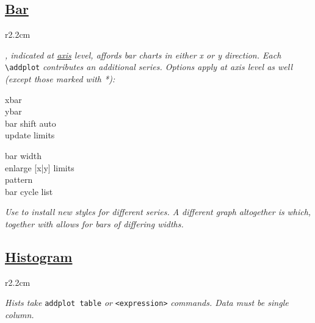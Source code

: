 \subsection*{\href{\docurl\#pgfp./pgfplots/xbar}{Bar}}

\begin{wrapfigure}[5]{r}{2.2cm}
\vspace{-8mm}
\resizebox{2cm}{!}{}
\end{wrapfigure}
\textit{, indicated at \underline{axis} level, affords bar charts in either x or y direction. Each }\texttt{\textbackslash addplot}\textit{ contributes an additional series. Options apply at axis level as well (except those marked with *):}

{\color{blue}
\begin{minipage}[t]{3.0cm}
xbar\\
ybar\\
bar shift auto\\
update limits
\end{minipage}
\begin{minipage}[t]{3.0cm}
bar width\\
enlarge [x|y] limits\\
pattern\\
bar cycle list
\end{minipage}}

\textit{Use }\textit{ to install new styles for different series. A different graph altogether is }\textit{ which, together with }\textit{ allows for bars of differing widths.}



\subsection*{\href{\docurl\#pgfp./pgfplots/hist}{Histogram}}

\begin{wrapfigure}[5]{r}{2.2cm}
\vspace{-8mm}
\resizebox{2cm}{!}{}
\end{wrapfigure}

\textit{Hist\textquotesingle s take }\texttt{addplot table}\textit{ or }\texttt{<expression>}\textit{ commands. Data must be single column.}\\
\\
\\


